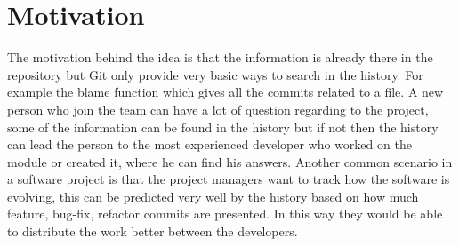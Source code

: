 \section{Motivation}
The motivation behind the idea is that the information is already there in the repository but Git only provide very basic ways to search in the history. 
For example the blame\cite{blame} function which gives all the commits related to a file. \newline
A new person who join the team can have a lot of question regarding to the project, some of the information can be found in the history but if not then the history can lead the person to the most experienced developer who worked on the module or created it, where he can find his answers.\newline
Another common scenario in a software project is that the project managers want to track how the software is evolving, this can be predicted very well by the history based on how much feature, bug-fix, refactor commits are presented. In this way they would be able to distribute the work better between the developers.